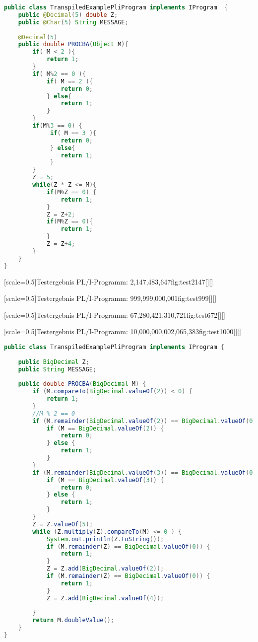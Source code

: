 \begin{lstlisting}[language=Java, caption=Probdivision-Algorhitmus Java, label={lst:javaprobedivision}]
public class TranspiledExamplePliProgram implements IProgram  { 
	public @Decimal(5) double Z;
	public @Char(5) String MESSAGE;
	
	@Decimal(5)
	public double PROCBA(Object M){
		if( M < 2 ){
			return 1;
		}
		if( M%2 == 0 ){
			if( M == 2 ){
				return 0;
			} else{ 
				return 1;
			}
		} 
		if(M%3 == 0) {
			 if( M == 3 ){
			 	return 0;
			 } else{ 
			 	return 1;
			 }
		}
		Z = 5;
		while(Z * Z <= M){ 
			if(M%Z == 0) {
				return 1;
			}
			Z = Z+2;
			if(M%Z == 0){
				return 1;
			}
			Z = Z+4;
		}
	}
}
\end{lstlisting}

[scale=0.5]{Testergebnis PL/I-Programm: 2,147,483,647}{fig:test2147}[][]

[scale=0.5]{Testergebnis PL/I-Programm: 999,999,000,001}{fig:test999}[][]

[scale=0.5]{Testergebnis PL/I-Programm: 67,280,421,310,721}{fig:test672}[][]

[scale=0.5]{Testergebnis PL/I-Programm: 10,000,000,002,065,383}{fig:test1000}[][]



\begin{lstlisting}[language=Java, caption=Angepasste Java-Programm, label={lst:javaprobedivisionang}]
public class TranspiledExamplePliProgram implements IProgram {
	
	public BigDecimal Z;
	public String MESSAGE;
	
	public double PROCBA(BigDecimal M) {
		if (M.compareTo(BigDecimal.valueOf(2)) < 0) {
			return 1;
		}
		//M % 2 == 0
		if (M.remainder(BigDecimal.valueOf(2)) == BigDecimal.valueOf(0)) {
			if (M == BigDecimal.valueOf(2)) {
				return 0;
			} else {
				return 1;
			}
		}
		if (M.remainder(BigDecimal.valueOf(3)) == BigDecimal.valueOf(0)) {
			if (M == BigDecimal.valueOf(3)) {
				return 0;
			} else {
				return 1;
			}
		}
		Z = Z.valueOf(5);
		while (Z.multiply(Z).compareTo(M) <= 0 ) {
			System.out.println(Z.toString());
			if (M.remainder(Z) == BigDecimal.valueOf(0)) {
				return 1;
			}
			Z = Z.add(BigDecimal.valueOf(2));
			if (M.remainder(Z) == BigDecimal.valueOf(0)) {
				return 1;
			}
			Z = Z.add(BigDecimal.valueOf(4));
			
		}
		return M.doubleValue();
	}
}

\end{lstlisting}